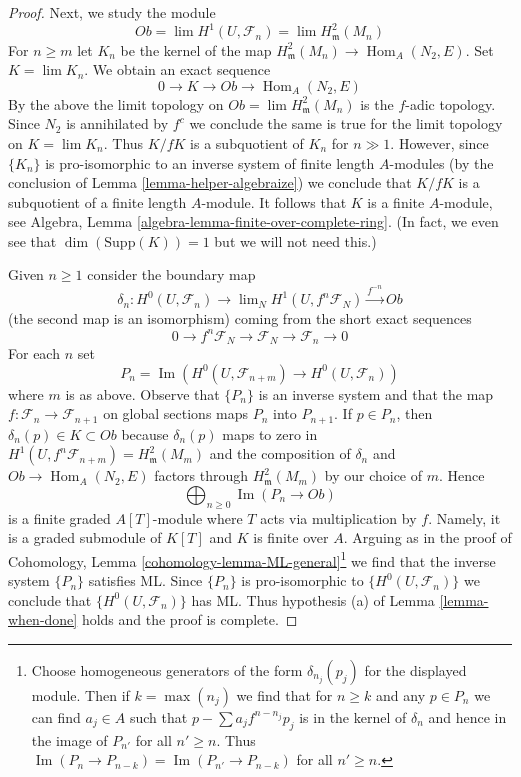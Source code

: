 \documentclass{stacks-project}
\theoremstyle{plain}
\theoremstyle{definition}
\theoremstyle{remark}
\numberwithin{equation}{subsection}
\def\lim{\mathop{\mathrm{lim}}\nolimits}
\def\Hom{\mathop{\mathrm{Hom}}\nolimits}
\def\Im{\mathop{\mathrm{Im}}}
\begin{document}
\begin{proof}
\medskip\noindent
Next, we study the module
$$
Ob = \lim H^1(U, \mathcal{F}_n) = \lim H^2_\mathfrak m(M_n)
$$
For $n \geq m$ let $K_n$ be the kernel of the map
$H^2_\mathfrak m(M_n) \to \Hom_A(N_2, E)$.
Set $K = \lim K_n$. We obtain an exact sequence
$$
0 \to K \to Ob \to \Hom_A(N_2, E)
$$
By the above the limit topology on $Ob = \lim H^2_\mathfrak m(M_n)$
is the $f$-adic topology. Since $N_2$ is annihilated by $f^c$
we conclude the same is true for the limit topology on $K = \lim K_n$.
Thus $K/fK$ is a subquotient of $K_n$ for $n \gg 1$.
However, since $\{K_n\}$ is pro-isomorphic to an inverse system of
finite length $A$-modules (by the conclusion of
Lemma \ref{lemma-helper-algebraize})
we conclude that $K/fK$ is a subquotient of a finite length
$A$-module. It follows that $K$ is a finite $A$-module, see
Algebra, Lemma \ref{algebra-lemma-finite-over-complete-ring}.
(In fact, we even see that $\dim(\text{Supp}(K)) = 1$ but
we will not need this.)

\medskip\noindent
Given $n \geq 1$ consider the boundary map
$$
\delta_n :
H^0(U, \mathcal{F}_n)
\longrightarrow
\lim_N H^1(U, f^n\mathcal{F}_N) \xrightarrow{f^{-n}} Ob
$$
(the second map is an isomorphism)
coming from the short exact sequences
$$
0 \to f^n\mathcal{F}_N \to \mathcal{F}_N \to \mathcal{F}_n \to 0
$$
For each $n$ set
$$
P_n = \Im(H^0(U, \mathcal{F}_{n + m}) \to H^0(U, \mathcal{F}_n))
$$
where $m$ is as above. Observe that $\{P_n\}$ is an inverse
system and that the map $f : \mathcal{F}_n \to \mathcal{F}_{n + 1}$
on global sections maps $P_n$ into $P_{n + 1}$.
If $p \in P_n$, then $\delta_n(p) \in K \subset Ob$
because $\delta_n(p)$ maps to zero in
$H^1(U, f^n\mathcal{F}_{n + m}) = H^2_\mathfrak m(M_m)$
and the composition of $\delta_n$ and $Ob \to \Hom_A(N_2, E)$
factors through $H^2_\mathfrak m(M_m)$ by our choice of $m$.
Hence
$$
\bigoplus\nolimits_{n \geq 0} \Im(P_n \to Ob)
$$
is a finite graded $A[T]$-module where $T$ acts via multiplication by $f$.
Namely, it is a graded submodule of $K[T]$ and $K$ is finite over $A$.
Arguing as in the proof of
Cohomology, Lemma \ref{cohomology-lemma-ML-general}\footnote{Choose
homogeneous generators of the form $\delta_{n_j}(p_j)$ for the displayed
module. Then if $k = \max(n_j)$ we find that for $n \geq k$
and any $p \in P_n$ we can find $a_j \in A$ such that
$p - \sum a_j f^{n - n_j} p_j$ is in the kernel of $\delta_n$
and hence in the image of $P_{n'}$ for all $n' \geq n$.
Thus $\Im(P_n \to P_{n - k}) = \Im(P_{n'} \to P_{n - k})$
for all $n' \geq n$.}
we find that the inverse system $\{P_n\}$ satisfies ML.
Since $\{P_n\}$ is pro-isomorphic to $\{H^0(U, \mathcal{F}_n)\}$
we conclude that $\{H^0(U, \mathcal{F}_n)\}$ has ML.
Thus hypothesis (a) of Lemma \ref{lemma-when-done}
holds and the proof is complete.
\end{proof}
\end{document}
